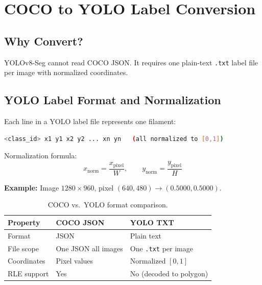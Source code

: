 \documentclass[12pt,a4paper,openany]{report}
\begin{document}
\chapter{COCO to YOLO Label Conversion}

\section{Why Convert?}

YOLOv8-Seg cannot read COCO JSON. It requires one plain-text \texttt{.txt} label file per
image with normalized coordinates.

\section{YOLO Label Format and Normalization}

Each line in a YOLO label file represents one filament:
\begin{lstlisting}[language=bash,caption={YOLO segmentation label format.}]
<class_id> x1 y1 x2 y2 ... xn yn   (all normalized to [0,1])
\end{lstlisting}

Normalization formula:
\begin{equation}
  x_{\text{norm}} = \frac{x_{\text{pixel}}}{W},\qquad
  y_{\text{norm}} = \frac{y_{\text{pixel}}}{H}
  \label{eq:norm}
\end{equation}

\textbf{Example:} Image $1280\times960$, pixel $(640,480) \to (0.5000, 0.5000)$.

\begin{table}[H]
\centering
\caption{COCO vs.\ YOLO format comparison.}
\renewcommand{\arraystretch}{1.3}
\begin{tabular}{l p{4.8cm} p{4.8cm}}
\toprule
\textbf{Property} & \textbf{COCO JSON} & \textbf{YOLO TXT} \\
\midrule
Format      & JSON                & Plain text \\
File scope  & One JSON all images & One \texttt{.txt} per image \\
Coordinates & Pixel values        & Normalized $[0,1]$ \\
RLE support & Yes                 & No (decoded to polygon) \\
\bottomrule
\end{tabular}
\label{tab:cocovsyolo}
\end{table}
\end{document}
